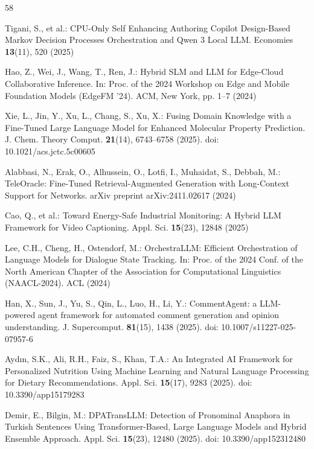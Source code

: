 \begin{thebibliography}{58}

Tigani, S., et al.: CPU-Only Self Enhancing Authoring Copilot Design-Based Markov Decision Processes Orchestration and Qwen 3 Local LLM. Economies \textbf{13}(11), 520 (2025)

Hao, Z., Wei, J., Wang, T., Ren, J.: Hybrid SLM and LLM for Edge-Cloud Collaborative Inference. In: Proc. of the 2024 Workshop on Edge and Mobile Foundation Models (EdgeFM '24). ACM, New York, pp. 1--7 (2024)

Xie, L., Jin, Y., Xu, L., Chang, S., Xu, X.: Fusing Domain Knowledge with a Fine-Tuned Large Language Model for Enhanced Molecular Property Prediction. J. Chem. Theory Comput. \textbf{21}(14), 6743--6758 (2025). doi: 10.1021/acs.jctc.5c00605

Alabbasi, N., Erak, O., Alhussein, O., Lotfi, I., Muhaidat, S., Debbah, M.: TeleOracle: Fine-Tuned Retrieval-Augmented Generation with Long-Context Support for Networks. arXiv preprint arXiv:2411.02617 (2024)

Cao, Q., et al.: Toward Energy-Safe Industrial Monitoring: A Hybrid LLM Framework for Video Captioning. Appl. Sci. \textbf{15}(23), 12848 (2025)

Lee, C.H., Cheng, H., Ostendorf, M.: OrchestraLLM: Efficient Orchestration of Language Models for Dialogue State Tracking. In: Proc. of the 2024 Conf. of the North American Chapter of the Association for Computational Linguistics (NAACL-2024). ACL (2024)

Han, X., Sun, J., Yu, S., Qin, L., Luo, H., Li, Y.: CommentAgent: a LLM-powered agent framework for automated comment generation and opinion understanding. J. Supercomput. \textbf{81}(15), 1438 (2025). doi: 10.1007/s11227-025-07957-6

Aydın, S.K., Ali, R.H., Faiz, S., Khan, T.A.: An Integrated AI Framework for Personalized Nutrition Using Machine Learning and Natural Language Processing for Dietary Recommendations. Appl. Sci. \textbf{15}(17), 9283 (2025). doi: 10.3390/app15179283

Demir, E., Bilgin, M.: DPATransLLM: Detection of Pronominal Anaphora in Turkish Sentences Using Transformer-Based, Large Language Models and Hybrid Ensemble Approach. Appl. Sci. \textbf{15}(23), 12480 (2025). doi: 10.3390/app152312480


\end{thebibliography}
